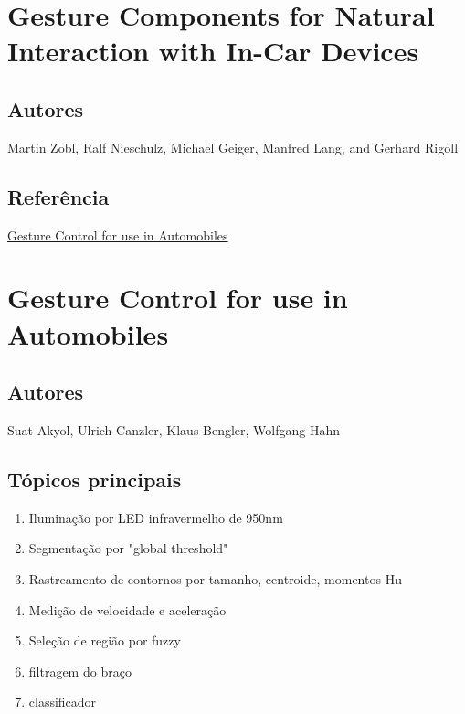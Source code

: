 \section{Gesture Components for Natural Interaction with In-Car Devices}
\label{Gesture Components for Natural Interaction with In-Car Devices}

\subsection{Autores}

Martin Zobl, Ralf Nieschulz, Michael Geiger, Manfred Lang, and Gerhard Rigoll

\subsection{Referência}

\hyperref[Gesture Control for use in Automobiles]{Gesture Control for use in Automobiles}

\section{Gesture Control for use in Automobiles}
\label{Gesture Control for use in Automobiles}

\subsection{Autores}

Suat Akyol, Ulrich Canzler, Klaus Bengler, Wolfgang Hahn

\subsection{Tópicos principais}

\begin{enumerate}
\item Iluminação por LED infravermelho de 950nm
\item Segmentação por "global threshold"
\item Rastreamento de contornos por tamanho, centroide, momentos Hu
\item Medição de velocidade e aceleração
\item Seleção de região por fuzzy
\item filtragem do braço
\item classificador 
\end{enumerate}

